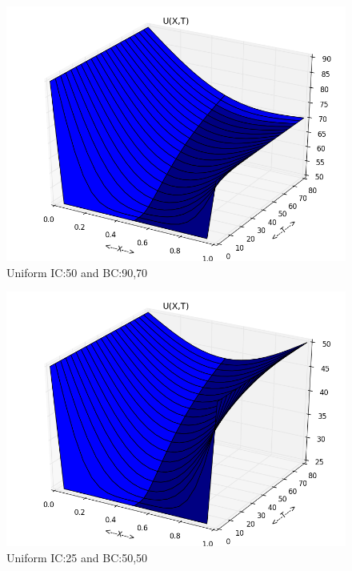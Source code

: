 \documentclass[letterpaper, 11 pt, conference]{ieeeconf}
\begin{document}
\begin{figure}
\includegraphics[scale=0.35]{plot_test_original_uni_1.png}
\caption{Uniform IC:50 and BC:90,70}
\label{uni1}
\end{figure}

\begin{figure}
\includegraphics[scale=0.35]{plot_test_original_uni_2.png}
\caption{Uniform IC:25 and BC:50,50}
\label{uni2}
\end{figure}
\end{document}
